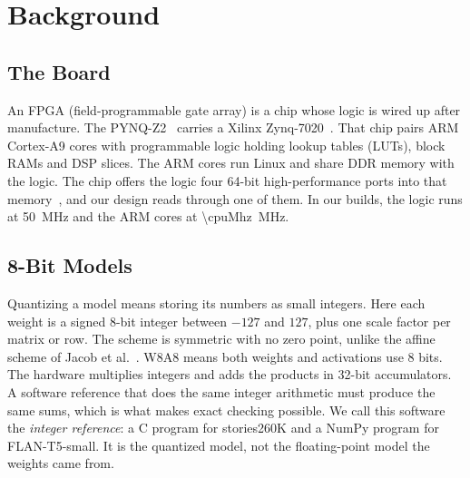 \documentclass[conference,10pt,letterpaper]{IEEEtran}
\newcommand{\pynq}{\mbox{PYNQ-Z2}}
\newcommand{\flan}{\mbox{FLAN-T5-small}}
\newcommand{\stories}{\mbox{stories260K}}
\newcommand{\eightbit}{\mbox{8-bit}}
\begin{document}
\section{Background}
\label{sec:background}

\subsection{The Board}
An FPGA (field-programmable gate array) is a chip whose logic is wired up after manufacture. The \pynq~\cite{pynqz2} carries a Xilinx Zynq-7020~\cite{zynq7000}. That chip pairs \armCores{} ARM Cortex-A9 cores with programmable logic holding \deviceLuts{} lookup tables (LUTs), \deviceBram{} block RAMs and \deviceDsp{} DSP slices. The ARM cores run Linux and share DDR memory with the logic. The chip offers the logic four 64-bit high-performance ports into that memory~\cite{ug585}, and our design reads through one of them. In our builds, the logic runs at \SI{50}{\mega\hertz} and the ARM cores at \SI{\cpuMhz}{\mega\hertz}.

\subsection{8-Bit Models}
Quantizing a model means storing its numbers as small integers. Here each weight is a signed \eightbit{} integer between $-127$ and $127$, plus one scale factor per matrix or row. The scheme is symmetric with no zero point, unlike the affine scheme of Jacob et al.~\cite{jacob2018quantization}. W8A8 means both weights and activations use 8 bits. The hardware multiplies integers and adds the products in 32-bit accumulators. A software reference that does the same integer arithmetic must produce the same sums, which is what makes exact checking possible. We call this software the \emph{integer reference}: a C program for \stories{} and a NumPy program for \flan. It is the quantized model, not the floating-point model the weights came from.
\end{document}
